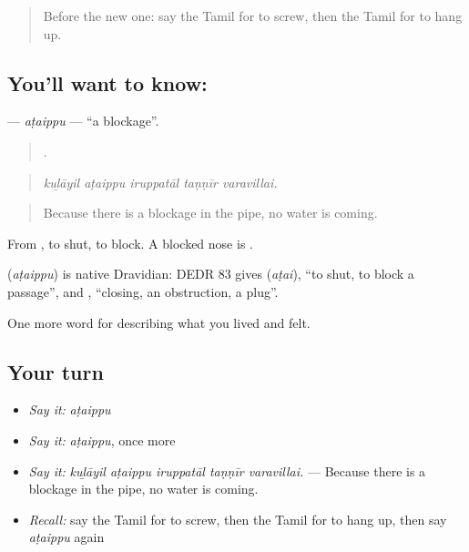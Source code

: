 \label{lesson:TA-C523-ataippu}



\begin{quote}
Before the new one: say the Tamil for to screw, then the Tamil for to hang up.
\end{quote}

\subsection*{You'll want to know: }
\textbf{} — \emph{aṭaippu} — \textquotedblleft{}a blockage\textquotedblright{}.

\begin{quote}
    .
\end{quote}

\begin{quote}
\emph{kuḻāyil aṭaippu iruppatāl taṇṇīr varavillai.}
\end{quote}

\begin{quote}
Because there is a blockage in the pipe, no water is coming.
\end{quote}

From , to shut, to block. A blocked nose is .

\begin{cousinweb}
\textbf{} (\emph{aṭaippu}) is native Dravidian: DEDR 83 gives  (\emph{aṭai}), \textquotedblleft{}to shut, to block a passage\textquotedblright{}, and , \textquotedblleft{}closing, an obstruction, a plug\textquotedblright{}.
\end{cousinweb}

\begin{grammarlens}[title={What you've built}]
One more word for describing what you lived and felt.
\end{grammarlens}

\subsection*{Your turn}
\begin{itemize}
\raggedright
  \item \emph{Say it:} \emph{aṭaippu}
  \item \emph{Say it:} \emph{aṭaippu}, once more
  \item \emph{Say it:} \emph{kuḻāyil aṭaippu iruppatāl taṇṇīr varavillai.} — Because there is a blockage in the pipe, no water is coming.
  \item \emph{Recall:} say the Tamil for to screw, then the Tamil for to hang up, then say \emph{aṭaippu} again
\end{itemize}

